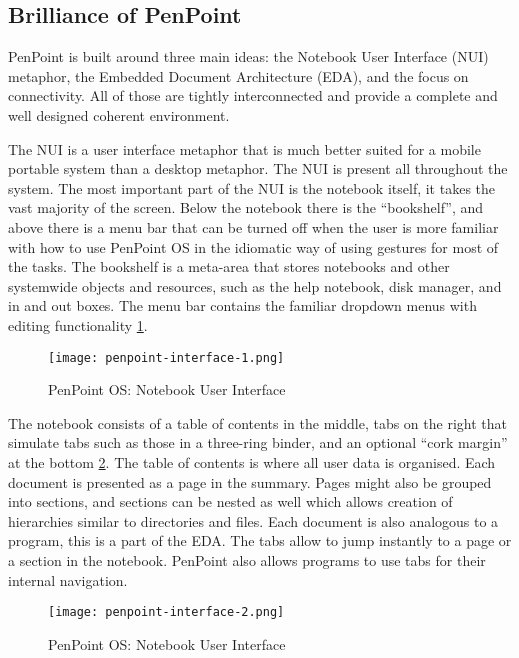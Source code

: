 \subsection{Brilliance of PenPoint}
PenPoint is built around three main ideas: the Notebook User Interface (NUI)
metaphor, the Embedded Document Architecture (EDA), and the focus on
connectivity. All of those are tightly interconnected and provide a complete
and well designed coherent environment.

The NUI is a user interface metaphor that is much better suited for a mobile
portable system than a desktop metaphor. The NUI is present all throughout the
system. The most important part of the NUI is the notebook itself, it takes the
vast majority of the screen. Below the notebook there is the ``bookshelf'', and
above there is a menu bar that can be turned off when the user is more familiar
with how to use PenPoint OS in the idiomatic way of using gestures for most of
the tasks. The bookshelf is a meta-area that stores notebooks and other
systemwide objects and resources, such as the help notebook, disk manager, and
in and out boxes. The menu bar contains the familiar dropdown menus with
editing functionality \ref{fig:notebook-user-interface1}.

\begin{figure}[!h]
    \centering \texttt{[image: penpoint-interface-1.png]}
    \caption{PenPoint OS: Notebook User Interface}
    \label{fig:notebook-user-interface1}
\end{figure}

The notebook consists of a table of contents in the middle, tabs on the right
that simulate tabs such as those in a three-ring binder, and an optional ``cork
margin'' at the bottom \ref{fig:notebook-user-interface2}. The table of contents
is where all user data is organised. Each document is presented as a page in
the summary. Pages might also be grouped into sections, and sections can be
nested as well which allows creation of hierarchies similar to directories and
files. Each document is also analogous to a program, this is a part of the EDA.
The tabs allow to jump instantly to a page or a section in the notebook.
PenPoint also allows programs to use tabs for their internal navigation.

\begin{figure}[!h]
    \centering \texttt{[image: penpoint-interface-2.png]}
    \caption{PenPoint OS: Notebook User Interface}
    \label{fig:notebook-user-interface2}
\end{figure}

